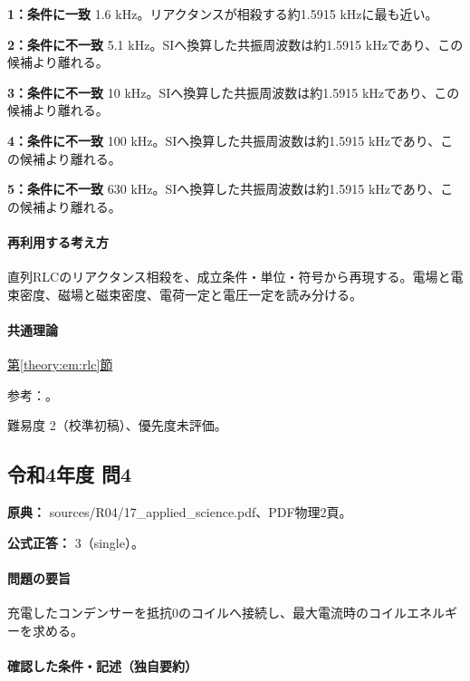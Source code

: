 \noindent\textbf{1：条件に一致} 1.6 kHz。リアクタンスが相殺する約1.5915 kHzに最も近い。\par

\noindent\textbf{2：条件に不一致} 5.1 kHz。SIへ換算した共振周波数は約1.5915 kHzであり、この候補より離れる。\par

\noindent\textbf{3：条件に不一致} 10 kHz。SIへ換算した共振周波数は約1.5915 kHzであり、この候補より離れる。\par

\noindent\textbf{4：条件に不一致} 100 kHz。SIへ換算した共振周波数は約1.5915 kHzであり、この候補より離れる。\par

\noindent\textbf{5：条件に不一致} 630 kHz。SIへ換算した共振周波数は約1.5915 kHzであり、この候補より離れる。\par

\paragraph{再利用する考え方} 直列RLCのリアクタンス相殺を、成立条件・単位・符号から再現する。電場と電束密度、磁場と磁束密度、電荷一定と電圧一定を読み分ける。

\paragraph{共通理論} \hyperref[theory:em:rlc]{第\ref*{theory:em:rlc}節}

\par 参考：\cite{mit_em12}。

\par 難易度 2（校準初稿）、優先度未評価。

\subsection{令和4年度 問4}
\label{q:r04-reg-applied-04}

\noindent\textbf{原典：} sources/R04/17\_applied\_science.pdf、PDF物理2頁。

\textbf{公式正答：} 3（single）。

\paragraph{問題の要旨} 充電したコンデンサーを抵抗0のコイルへ接続し、最大電流時のコイルエネルギーを求める。

\paragraph{確認した条件・記述（独自要約）}\mbox{}\par

